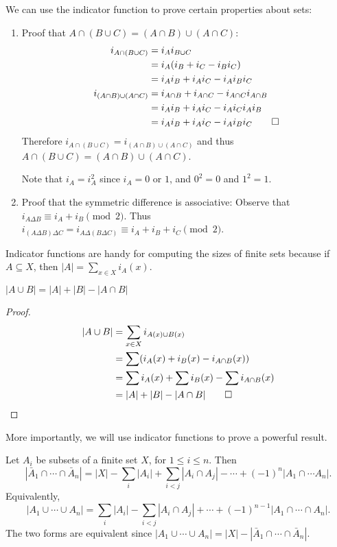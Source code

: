 \documentclass[a4paper]{article}
\begin{document}
\begin{eg}
  We can use the indicator function to prove certain properties about sets:
  \begin{enumerate}
    \item Proof that $A\cap(B\cup C) = (A\cap B)\cup (A\cap C)$:
      \begin{align*}
        i_{A\cap (B\cup C)} &= i_Ai_{B\cup C}\\
        &= i_A(i_B + i_C - i_Bi_C)\\
        &= i_Ai_B + i_Ai_C - i_Ai_Bi_C\\
        i_{(A\cap B)\cup (A\cap C)} &= i_{A\cap B} + i_{A\cap C} - i_{A\cap C}i_{A\cap B}\\
        &= i_Ai_B + i_Ai_C - i_Ai_Ci_Ai_B\\
        &= i_Ai_B + i_Ai_C - i_Ai_Bi_C \qedhere
      \end{align*}
      Therefore $i_{A\cap (B\cup C)} = i_{(A\cap B)\cup (A\cap C)}$ and thus $A\cap(B\cup C) = (A\cap B)\cup (A\cap C)$.

      Note that $i_A = i_A^2$ since $i_A = 0 $ or $1$, and $0^2 = 0$ and $1^2 = 1$.
    \item Proof that the symmetric difference is associative: Observe that $i_{A\Delta B} \equiv i_A + i_B \pmod 2$. Thus $i_{(A\Delta B)\Delta C} = i_{A\Delta(B\Delta C)} \equiv i_A + i_B + i_C \pmod2$.
  \end{enumerate}
\end{eg}
Indicator functions are handy for computing the sizes of finite sets because if $A\subseteq X$, then $|A| = \sum\limits_{x\in X}i_A(x)$.

\begin{prop}
  $|A\cup B| = |A| + |B| - |A\cap B|$
\end{prop}

\begin{proof}
  \begin{align*}
    |A\cup B| &= \sum_{x\in X} i_{A(x)\cup B(x)}\\
    &= \sum (i_A(x) + i_B(x) - i_{A\cap B}(x))\\
    &= \sum i_A(x) + \sum i_B(x) - \sum i_{A\cap B}(x)\\
    &= |A| + |B| - |A\cap B|\qedhere
  \end{align*}
\end{proof}

More importantly, we will use indicator functions to prove a powerful result.
\begin{thm}
  Let $A_i$ be subsets of a finite set $X$, for $1 \leq i\leq n$. Then
  \[
    |\bar A_1\cap \cdots \cap \bar A_n| = |X| - \sum_i |A_i| + \sum_{i < j}|A_i\cap A_j| - \cdots + (-1)^n|A_1\cap \cdots A_n|.
  \]
  Equivalently,
  \[
    |A_1\cup \cdots \cup A_n| = \sum_i|A_i| - \sum_{i < j}|A_i\cap A_j| + \cdots +(-1)^{n-1}|A_1\cap \cdots \cap A_n|.
  \]
  The two forms are equivalent since $|A_1\cup\cdots\cup A_n| = |X| - |\bar A_1\cap \cdots \cap \bar A_n|$.
\end{thm}
\end{document}
